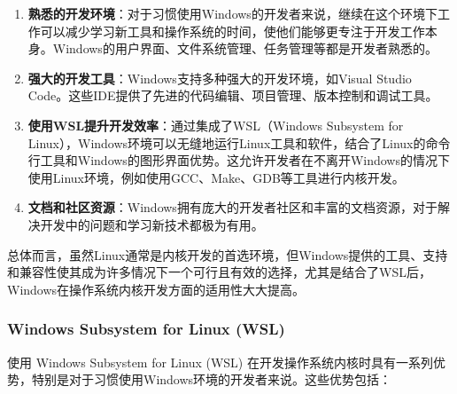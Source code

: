 \begin{enumerate}
    \item \textbf{熟悉的开发环境}：对于习惯使用Windows的开发者来说，继续在这个环境下工作可以减少学习新工具和操作系统的时间，使他们能够更专注于开发工作本身。Windows的用户界面、文件系统管理、任务管理等都是开发者熟悉的。
    \item \textbf{强大的开发工具}：Windows支持多种强大的开发环境，如Visual Studio Code。这些IDE提供了先进的代码编辑、项目管理、版本控制和调试工具。
    \item \textbf{使用WSL提升开发效率}：通过集成了WSL（Windows Subsystem for Linux），Windows环境可以无缝地运行Linux工具和软件，结合了Linux的命令行工具和Windows的图形界面优势。这允许开发者在不离开Windows的情况下使用Linux环境，例如使用GCC、Make、GDB等工具进行内核开发。
    \item \textbf{文档和社区资源}：Windows拥有庞大的开发者社区和丰富的文档资源，对于解决开发中的问题和学习新技术都极为有用。
\end{enumerate}

总体而言，虽然Linux通常是内核开发的首选环境，但Windows提供的工具、支持和兼容性使其成为许多情况下一个可行且有效的选择，尤其是结合了WSL后，Windows在操作系统内核开发方面的适用性大大提高。

\subsubsection{Windows Subsystem for Linux (WSL)}

使用 Windows Subsystem for Linux (WSL) 在开发操作系统内核时具有一系列优势，特别是对于习惯使用Windows环境的开发者来说。这些优势包括：

